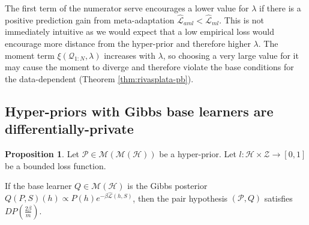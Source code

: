 \documentclass{article}
\theoremstyle{definition}
\newtheorem{proposition}{Proposition}[section]
\begin{document}
The first term of the numerator serve encourages a lower value for $\lambda$ if there is a positive prediction gain from meta-adaptation $\hat{\mathcal{L}}_{aml}<\hat{\mathcal{L}}_{ml}$. This is not immediately intuitive as we would expect that a low empirical loss would encourage more distance from the hyper-prior and therefore higher $\lambda$. The moment term $\xi(\mathcal{Q}_{1:N}, \lambda)$ increases with $\lambda$, so choosing a very large value for it may cause the moment to diverge and therefore violate the base conditions for the data-dependent (Theorem \ref{thm:rivasplata-pb}). 

%
%
%

\subsection{Hyper-priors with Gibbs base learners are differentially-private} \label{append:proof-dp}

\begin{proposition} \label{thm:pair-is-dp-appendix}
	Let $\mathcal{P}\in \mathcal{M}(\mathcal{M}(\mathcal{H}))$ be a hyper-prior.
	Let $l:\mathcal{H}\times \mathcal{Z}\rightarrow [0,1]$ be a bounded loss function.
	
	If the base learner $Q\in \mathcal{M}(\mathcal{H})$ is the Gibbs posterior $Q(P, S)(h)\propto P(h)e^{-\beta\hat{\mathcal{L}}(h, S)}$, 
	then the pair hypothesis $(\mathcal{P}, Q)$ satisfies $DP\left (\frac{2\beta}{m}\right )$.
\end{proposition}
\end{document}
